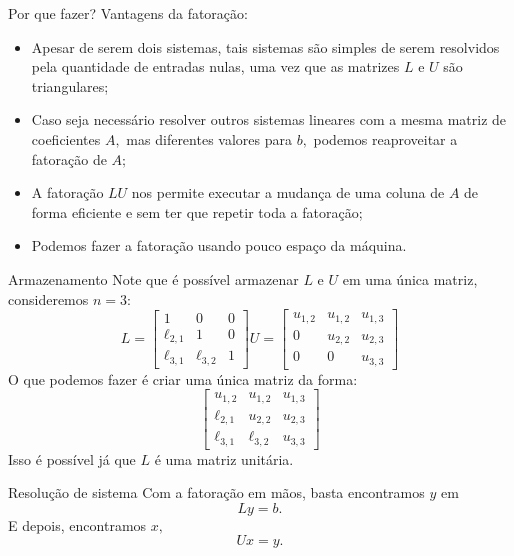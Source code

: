 \documentclass[]{beamer}
\begin{document}
\begin{frame}{Por que fazer?}
Vantagens da fatoração:
\begin{itemize}
	\item Apesar de serem dois sistemas, tais sistemas são simples de serem resolvidos pela quantidade de entradas nulas, uma vez que as matrizes $L$ e $U$ são triangulares;
	
	\item  Caso seja necessário resolver outros sistemas lineares com a mesma matriz de coeficientes $A,$ mas diferentes valores para $b,$ podemos reaproveitar a fatoração de $A;$
	
	\item A fatoração $LU$ nos permite executar a mudança de uma coluna de $A$ de forma eficiente e sem ter que repetir toda a fatoração;
	
	\item Podemos fazer a fatoração usando pouco espaço da máquina.
\end{itemize}

\end{frame}

\begin{frame}{Armazenamento}
Note que é possível armazenar $L$ e $U$ em uma única matriz, consideremos $n =3:$
$$L=\begin{bmatrix}1&0&0\\ \ell_{2,1}&1&0\\ \ell_{3,1}&\ell_{3,2}&1\end{bmatrix} U = \begin{bmatrix}u_{1,2}&u_{1,2}&u_{1,3}\\ 0&u_{2,2}&u_{2,3}\\ 0&0&u_{3,3}\end{bmatrix}$$ 
O que podemos fazer é criar uma única matriz da forma:
$$\begin{bmatrix}u_{1,2}&u_{1,2}&u_{1,3}\\ \ell_{2,1}&u_{2,2}&u_{2,3}\\ \ell_{3,1}&\ell_{3,2}&u_{3,3}\end{bmatrix}$$ 
Isso é possível já que $L$ é uma matriz unitária.
\end{frame}



\begin{frame}{Resolução de sistema}
	Com a fatoração em mãos, basta encontramos $y$ em
	$$Ly=b. $$
	E depois, encontramos $x,$
	$$ Ux=y.$$
\end{frame}
\end{document}
